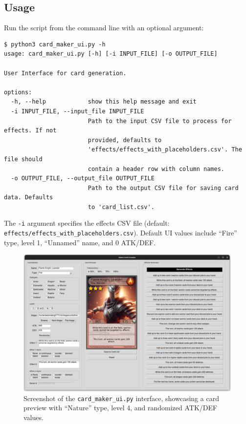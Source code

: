 \subsection{Usage}
Run the script from the command line with an optional argument:
\begin{lstlisting}[style=terminalstyle]
$ python3 card_maker_ui.py -h
usage: card_maker_ui.py [-h] [-i INPUT_FILE] [-o OUTPUT_FILE]

User Interface for card generation.

options:
  -h, --help            show this help message and exit
  -i INPUT_FILE, --input_file INPUT_FILE
                        Path to the input CSV file to process for effects. If not
                        provided, defaults to
                        'effects/effects_with_placeholders.csv'. The file should
                        contain a header row with column names.
  -o OUTPUT_FILE, --output_file OUTPUT_FILE
                        Path to the output CSV file for saving card data. Defaults
                        to 'card_list.csv'.
\end{lstlisting}
The \texttt{-i} argument specifies the effects CSV file (default: \texttt{effects/effects\_with\_placeholders.csv}). Default UI values include ``Fire'' type, level 1, ``Unnamed'' name, and 0 ATK/DEF.

\begin{figure}[h]
	\centering
	\includegraphics[width=\textwidth]{images/ui_sample.png}
	\caption{Screenshot of the \texttt{card\_maker\_ui.py} interface, showcasing a card preview with ``Nature'' type, level 4, and randomized ATK/DEF values.}
	\label{fig:card_maker_ui_screenshot}
\end{figure}

